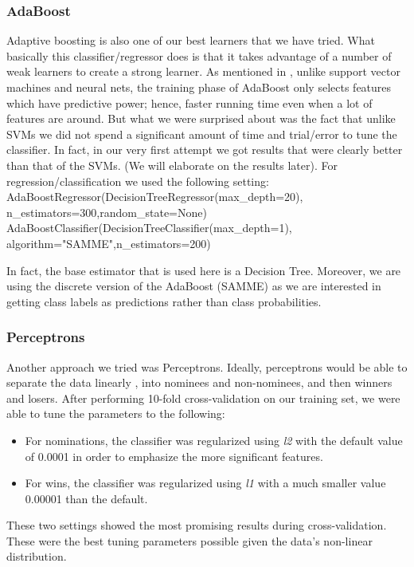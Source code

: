 \documentclass[journal,transmag]{IEEEtran}
\begin{document}
			\subsubsection{AdaBoost}
			\label{adaboost}
			Adaptive boosting is also one of our best learners that we have tried. What basically this classifier/regressor does is that it takes advantage of a number of weak learners to create a strong learner. As mentioned in \cite{adaboost}, unlike support vector machines and neural nets, the training phase of AdaBoost only selects features which have predictive power; hence, faster running time even when a lot of features are around. But what we were surprised about was the fact that unlike SVMs we did not spend a significant amount of time and trial/error to tune the classifier. In fact, in our very first attempt we got results that were clearly better than that of the SVMs. (We will elaborate on the results later). For regression/classification we used the following setting:\\
AdaBoostRegressor(DecisionTreeRegressor(max\_depth=20),\\
n\_estimators=300,random\_state=None)\\
AdaBoostClassifier(DecisionTreeClassifier(max\_depth=1),\\
algorithm="SAMME",n\_estimators=200)

In fact, the base estimator that is used here is a Decision Tree. Moreover, we are using the discrete version of the AdaBoost (SAMME) as we are interested in getting class labels as predictions rather than class probabilities.
			
			\subsubsection{Perceptrons}
			Another approach we tried was Perceptrons. Ideally, perceptrons would be able to separate the data linearly \cite{perceptron}, into nominees and non-nominees, and then winners and losers. After performing 10-fold cross-validation on our training set, we were able to tune the parameters to the following:
			\begin{itemize}
				\item For nominations, the classifier was regularized using \emph{l2} with the default value of 0.0001 in order to emphasize the more significant features.
				\item For wins, the classifier was regularized using \emph{l1} with a much smaller value 0.00001 than the default.
			\end{itemize}
			These two settings showed the most promising results during cross-validation.
			These were the best tuning parameters possible given the data's non-linear distribution.
			
\end{document}

